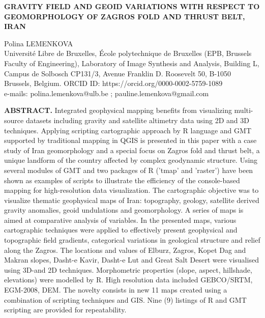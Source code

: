 \documentclass[12pt,a4paper,oneside]{article}
\begin{document}
\thispagestyle{fancy}

\vspace*{38pt}



\begin{center}{\large\bf\uppercase{
Gravity field and geoid variations with respect to geomorphology of Zagros Fold and Thrust Belt, Iran}}
\end{center}

\vspace*{4pt}


\begin{center}
Polina \uppercase{Lemenkova} \\
Université Libre de Bruxelles, École polytechnique de Bruxelles (EPB, Brussels Faculty of Engineering), Laboratory of Image Synthesis and Analysis, Building L, Campus de Solbosch CP131/3, Avenue Franklin D. Roosevelt 50, B-1050 Brussels, Belgium. ORCID ID: https://orcid.org/0000-0002-5759-1089 \\
e-mails: polina.lemenkova@ulb.be ; pauline.lemenkova@gmail.com \\
\end{center}

\vspace{30pt}


{\bf ABSTRACT.} Integrated geophysical mapping benefits from visualizing multi-source datasets including gravity and satellite altimetry data using 2D and 3D techniques. Applying scripting cartographic approach by R language and GMT supported by traditional mapping in QGIS is presented in this paper with a case study of Iran geomorphology and a special focus on Zagros fold and thrust belt, a unique landform of the country affected by complex geodynamic structure. Using several modules of GMT and two packages of R ('tmap' and 'raster') have been shown as examples of scripts to illustrate the efficiency of the console-based mapping for high-resolution data visualization. The cartographic objective was to visualize thematic geophysical maps of Iran: topography, geology, satellite derived gravity anomalies, geoid undulations and geomorphology. A series of maps is aimed at comparative analysis of variables. In the presented maps, various cartographic techniques were applied to effectively present geophysical and topographic field gradients, categorical variations in geological structure and relief along the Zagros. The locations and values of Elburz, Zagros, Kopet Dag and Makran slopes, Dasht-e Kavir, Dasht-e Lut and Great Salt Desert were visualised using 3D-and 2D techniques. Morphometric properties (slope, aspect, hillshade, elevations) were modelled by R. High resolution data included GEBCO/SRTM, EGM-2008, DEM. The novelty consists in new 11 maps created using a combination of scripting techniques and GIS. Nine (9) listings of R and GMT scripting are provided for repeatability.
\end{document}
